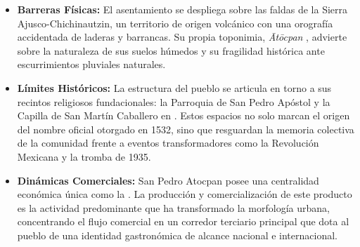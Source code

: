 \begin{itemize}
    \item \textbf{Barreras Físicas:} El asentamiento se despliega sobre las faldas de la 
            Sierra Ajusco-Chichinautzin, un territorio de origen volcánico con una 
            orografía accidentada de laderas y barrancas. 
            Su propia toponimia, \textit{Ātōcpan} , 
            advierte sobre la naturaleza de sus suelos húmedos y su fragilidad histórica ante 
            escurrimientos pluviales naturales.
    \item \textbf{Límites Históricos:} La estructura del pueblo se articula en torno a sus 
            recintos religiosos fundacionales: la Parroquia de San Pedro Apóstol y la 
            Capilla de San Martín Caballero en . Estos espacios 
            no solo marcan el origen del nombre oficial otorgado en 1532, sino que resguardan 
            la memoria colectiva de la comunidad frente a eventos transformadores como la 
            Revolución Mexicana y la tromba de 1935.
    \item \textbf{Dinámicas Comerciales:} San Pedro Atocpan posee una centralidad económica 
            única como la . La producción y comercialización 
            de este producto es la actividad predominante que ha transformado la morfología 
            urbana, concentrando el flujo comercial en un corredor terciario principal 
            que dota al pueblo de una identidad gastronómica de alcance nacional 
            e internacional.
\end{itemize}

